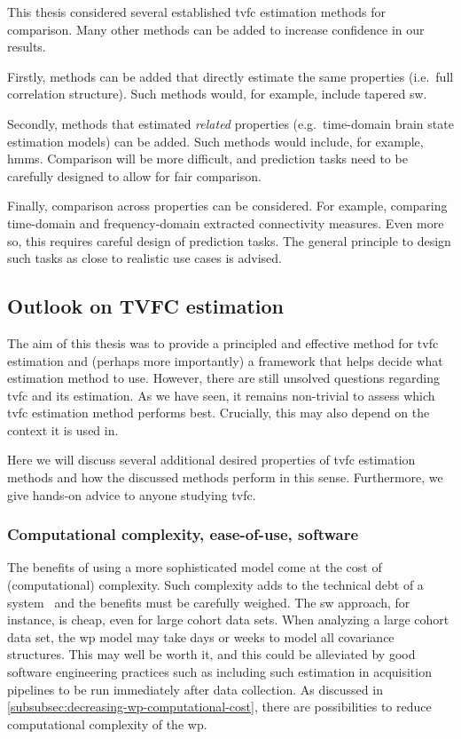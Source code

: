 This thesis considered several established \gls{tvfc} estimation methods for comparison.
Many other methods can be added to increase confidence in our results.

Firstly, methods can be added that directly estimate the same properties (i.e.~full correlation structure).
Such methods would, for example, include tapered \gls{sw}.

Secondly, methods that estimated \emph{related} properties (e.g.~time-domain brain state estimation models) can be added.
Such methods would include, for example, \glspl{hmm}.
Comparison will be more difficult, and prediction tasks need to be carefully designed to allow for fair comparison.

Finally, comparison across properties can be considered.
For example, comparing time-domain and frequency-domain extracted connectivity measures.
Even more so, this requires careful design of prediction tasks.
The general principle to design such tasks as close to realistic use cases is advised.

\subsection{Outlook on TVFC estimation}

The aim of this thesis was to provide a principled and effective method for \gls{tvfc} estimation and (perhaps more importantly) a framework that helps decide what estimation method to use.
However, there are still unsolved questions regarding \gls{tvfc} and its estimation.
As we have seen, it remains non-trivial to assess which \gls{tvfc} estimation method performs best.
Crucially, this may also depend on the context it is used in.

Here we will discuss several additional desired properties of \gls{tvfc} estimation methods and how the discussed methods perform in this sense.
Furthermore, we give hands-on advice to anyone studying \gls{tvfc}.

\subsubsection{Computational complexity, ease-of-use, software}

The benefits of using a more sophisticated model come at the cost of (computational) complexity.
Such complexity adds to the technical debt of a system~\parencite{Sculley2015} and the benefits must be carefully weighed.
The \gls{sw} approach, for instance, is cheap, even for large cohort data sets.
When analyzing a large cohort data set, the \gls{wp} model may take days or weeks to model all covariance structures.
This may well be worth it, and this could be alleviated by good software engineering practices such as including such estimation in acquisition pipelines to be run immediately after data collection.
%
As discussed in \cref{subsubsec:decreasing-wp-computational-cost}, there are possibilities to reduce computational complexity of the \gls{wp}.

